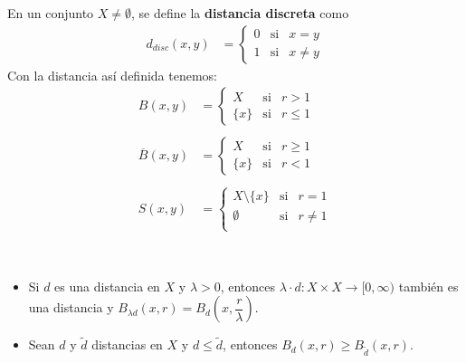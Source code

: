 \begin{ejemplo}
    En un conjunto $X \neq \emptyset$, se define la \textbf{distancia discreta} como 
    \begin{align*}
        d_{disc}(x,y) &=
        \left\{ 
        \begin{array}{ccc}
            0 & \text{si} & x=y\\
            1 & \text{si} & x\neq y
        \end{array}
        \right. 
    \end{align*}
    Con la distancia así definida tenemos:
    \begin{align*}
        B(x,y) &=
        \left\{ 
        \begin{array}{ccc}
            X & \text{si} & r>1\\
            \{x\} & \text{si} & r \leq 1
        \end{array}
        \right. \\\\
        \overline{B}(x,y) &=
        \left\{ 
        \begin{array}{ccc}
            X & \text{si} & r \geq 1\\
            \{x\} & \text{si} & r < 1
        \end{array}
        \right.\\\\
        S(x,y) &=
        \left\{ 
        \begin{array}{ccc}
            X \setminus \{x\} & \text{si} & r =1 \\
            \emptyset & \text{si} & r \neq 1\\
        \end{array}
        \right.
    \end{align*}
    \endsquare
\end{ejemplo}


\begin{ejemplo}\
    \begin{itemize}
        \item Si $d$ es una distancia en $X$ y $\lambda > 0$, entonces $\lambda \cdot d : X \times X \rightarrow [0,\infty)$ también es una distancia y $B_{\lambda d}(x,r) = B_d\left(x, \dfrac{r}{\lambda}\right)$.
        \item Sean $d$ y $\tilde{d}$ distancias en $X$ y $d \leq \tilde{d}$, entonces $B_d(x,r) \geq B_{\tilde{d}}(x,r)$.
    \end{itemize}
    \endsquare
\end{ejemplo}

